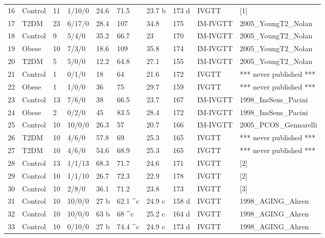 \documentclass[utf8]{frontiersSCNS} %
\begin{document}
\begin{table}[h]
{\begin{tabular}{llllllllll}
16 & Control & 11 & 1/10/0  & 24.6   & 71.5    & 23.7 b & 173 d & IVGTT    & [1]                      \\
17 & T2DM    & 23 & 6/17/0  & 28.4   & 107     & 34.8   & 175   & IM-IVGTT & 2005_YoungT2_Nolan       \\
18 & Control & 9  & 5/4/0   & 35.2   & 66.7    & 23     & 170   & IM-IVGTT & 2005_YoungT2_Nolan       \\
19 & Obese   & 10 & 7/3/0   & 18.6   & 109     & 35.8   & 174   & IM-IVGTT & 2005_YoungT2_Nolan       \\
20 & T2DM    & 5  & 5/0/0   & 12.2   & 64.8    & 27.1   & 155   & IM-IVGTT & 2005_YoungT2_Nolan       \\
21 & Control & 1  & 0/1/0   & 18     & 64      & 21.6   & 172   & IVGTT    & *** never published ***  \\
22 & Obese   & 1  & 1/0/0   & 36     & 75      & 29.7   & 159   & IVGTT    & *** never published ***  \\
23 & Control & 13 & 7/6/0   & 38     & 66.5    & 23.7   & 167   & IM-IVGTT & 1998_InsSens_Pacini      \\
24 & Obese   & 2  & 0/2/0   & 45     & 83.5    & 28.4   & 172   & IM-IVGTT & 1998_InsSens_Pacini      \\
25 & Control & 10 & 10/0/0  & 26.3   & 57      & 20.7   & 166   & IM-IVGTT & 2005_PCOS_Gennarelli     \\
26 & T2DM    & 10 & 4/6/0   & 57.8   & 69      & 25.3   & 165   & IVGTT    & *** never published ***  \\
27 & T2DM    & 10 & 4/6/0   & 54.6   & 68.9    & 25.3   & 165   & IVGTT    & *** never published ***  \\
28 & Control & 13 & 1/1/13  & 68.3   & 71.7    & 24.6   & 171   & IVGTT    & [2]                      \\
29 & Control & 10 & 1/1/10  & 26.7   & 72.3    & 22.9   & 178   & IVGTT    & [2]                      \\
30 & Control & 10 & 2/8/0   & 36.1   & 71.2    & 23.8   & 173   & IVGTT    & [3]                      \\
31 & Control & 10 & 10/0/0  & 27 b   & 62.1 ^c & 24.9 c & 158 d & IVGTT    & 1998_AGING_Ahren         \\
32 & Control & 10 & 10/0/0  & 63 b   & 68 ^c   & 25.2 c & 164 d & IVGTT    & 1998_AGING_Ahren         \\
33 & Control & 10 & 0/10/0  & 27 b   & 74.4 ^c & 24.9 c & 173 d & IVGTT    & 1998_AGING_Ahren         \\

\end{tabular}}
\end{table}
\end{document}
